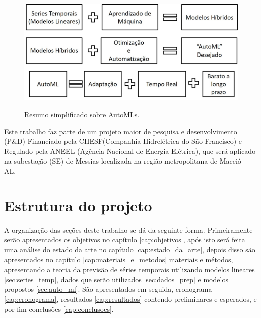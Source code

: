 \begin{figure}[!htbp]
    \centering
    \caption{Resumo simplificado sobre AutoMLs.}
    \includegraphics[width=\textwidth]{Figuras/introducao/intro_nutshell.jpg}
    \label{fig:cap1_intro_nutshell}
\end{figure}

Este trabalho faz parte de um projeto maior de pesquisa e desenvolvimento (P\&D) Financiado pela CHESF(Companhia Hidrelétrica do São Francisco) e Regulado pela ANEEL (Agência Nacional de Energia Elétrica), que será aplicado na subestação (SE) de Messias localizada na região metropolitana de Maceió - AL.

\section{Estrutura do projeto}

A organização das seções deste trabalho se dá da seguinte forma. Primeiramente serão apresentados os objetivos no capítulo \ref{cap:objetivos}, após isto será feita uma análise do estado da arte no capítulo \ref{cap:estado_da_arte}, depois disso são apresentados no capítulo \ref{cap:materiais_e_metodos} materiais e métodos, apresentando a teoria da previsão de séries temporais utilizando modelos lineares \ref{sec:series_temp}, dados que serão utilizados \ref{sec:dados_prep} e modelos propostos \ref{sec:auto_ml}. São apresentados em seguida, cronograma \ref{cap:cronograma}, resultados \ref{cap:resultados} contendo preliminares e esperados, e por fim conclusões \ref{cap:conclusoes}.